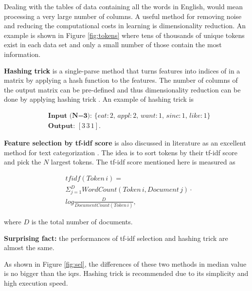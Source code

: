 \documentclass{sig-alternate-05-2015}
\begin{document}
Dealing with the tables of data containing all the words in English, would mean processing a very large number of columns. A useful method for removing noise and reducing the computational costs in learning is dimensionality reduction. An example is shown in Figure \ref{fig:tokens} where tens of thousands of unique tokens exist in each data set and only a small number of those contain the most information. 

\textbf{Hashing trick} is a single-parse method that turns features into indices of in a matrix by applying a hash function to the features. The number of columns of the output matrix can be pre-defined and thus dimensionality reduction can be done by applying hashing trick \cite{weinberger2009feature}. An example of hashing trick is

\begin{equation*}
\begin{aligned}
    &\textbf{Input (N=3): }\{eat: 2,\, appl: 2,\, want: 1,\, sinc: 1,\,like: 1\}\\
    &\textbf{Output: }[3 \, 3 \, 1].
\end{aligned}
\end{equation*}

\textbf{Feature selection by tf-idf score} is also discussed in literature as an excellent method for text categorization \cite{menzies2006improving}. The idea is to sort tokens by their tf-idf score and pick the $N$ largest tokens. The tf-idf score mentioned here is measured as

\begin{equation*}
\begin{aligned}
   &tfidf(Token \,i)=\\
   &\Sigma^{D}_{j=1} WordCount(Token\, i, Document \,j)\cdot\\
   &log\frac{D}{DocumentCount(Token\,i)}, 
\end{aligned}
\end{equation*}

where $D$ is the total number of documents.


\textbf{Surprising fact:} the performances of tf-idf selection and hashing trick are almost the same. 

As shown in Figure \ref{fig:sel}, the differences of these two methods in median value is no bigger than the iqrs. Hashing trick is recommended due to its simplicity and high execution speed. 
\end{document}
